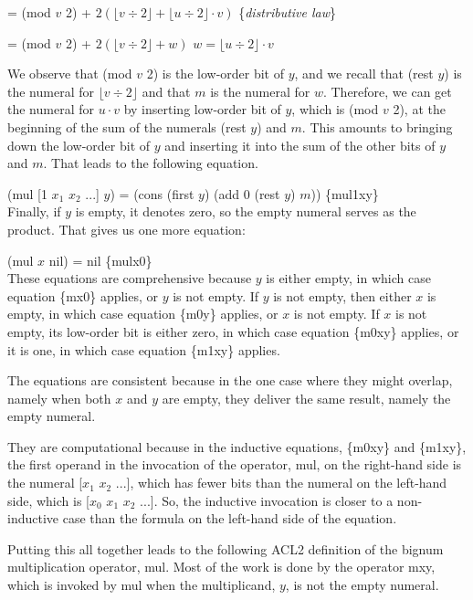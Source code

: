 \hspace{1.7cm} = (mod $v$ 2) + $2(\lfloor v \div 2 \rfloor + \lfloor u \div 2 \rfloor \cdot v)$
\hfill \{\emph{distributive law}\}

\hspace{1.7cm} = (mod $v$ 2) + $2(\lfloor v \div 2 \rfloor + w)$
\hfill $w = \lfloor u \div 2 \rfloor \cdot v$

We observe that (mod $v$ 2) is the low-order bit of $y$,
and we recall that (rest $y$) is the numeral for $\lfloor v \div 2 \rfloor$
and that $m$ is the numeral for $w$.
Therefore, we can get the numeral for $u \cdot v$
by inserting low-order bit of $y$, which is (mod $v$ 2),
at the beginning of the sum of the numerals (rest $y$) and $m$.
This amounts to bringing down the low-order bit of $y$
and inserting it into the sum of the other bits of $y$ and $m$.
That leads to the following equation.

\hspace{2cm} (mul [1 $x_1$ $x_2$ ...] $y$) = (cons (first $y$) (add 0 (rest $y$) $m$)) \hfill \{mul1xy\}
\\

Finally, if $y$ is empty, it denotes zero, so the empty numeral
serves as the product. That gives us one more equation:

\hspace{2cm} (mul $x$ nil) = nil \hfill \{mulx0\}
\\

These equations are comprehensive because $y$ is either empty,
in which case equation \{mx0\} applies,
or $y$ is not empty.
If $y$ is not empty, then either $x$ is empty, in which case
equation \{m0y\} applies, or $x$ is not empty.
If $x$ is not empty, its low-order bit is either zero,
in which case equation \{m0xy\} applies, or it is one,
in which case equation \{m1xy\} applies.

The equations are consistent because in the one case
where they might overlap, namely when both $x$ and $y$
are empty, they deliver the same result, namely the empty numeral.

They are computational because in the inductive equations,
\{m0xy\} and \{m1xy\}, the first operand in
the invocation of the operator, mul, on the right-hand side
is the numeral [$x_1$ $x_2$ ...], which has fewer bits
than the numeral on the left-hand side, which is
[$x_0$ $x_1$ $x_2$ ...].
So, the inductive invocation is closer to a non-inductive
case than the formula on the left-hand side of the equation.

Putting this all together leads to the following ACL2 definition
of the bignum multiplication operator, mul.
Most of the work is done by the operator mxy,
which is invoked by mul when the multiplicand, $y$, 
is not the empty numeral.

